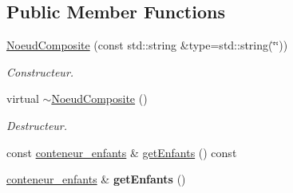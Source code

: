 \subsection*{Public Member Functions}
\begin{DoxyCompactItemize}
\item 
\hyperlink{group__inf2990_ga21f20f8612314721e4e63ea0596d0b42}{Noeud\-Composite} (const std\-::string \&type=std\-::string(\char`\"{}\char`\"{}))
\begin{DoxyCompactList}\small\item\em Constructeur. \end{DoxyCompactList}\item 
virtual \hyperlink{group__inf2990_gaada4bd846bd950f2ac186b09f35aa9c6}{$\sim$\-Noeud\-Composite} ()
\begin{DoxyCompactList}\small\item\em Destructeur. \end{DoxyCompactList}\item 
const \hyperlink{class_noeud_composite_a697e52516e154d6943a1e1aa9533c317}{conteneur\-\_\-enfants} \& \hyperlink{class_noeud_composite_a2aa41adb03339f75732a86016be65112}{get\-Enfants} () const 
\item 
\hypertarget{class_noeud_composite_a2c498f2235878e7bb686b4da27fb86da}{\hyperlink{class_noeud_composite_a697e52516e154d6943a1e1aa9533c317}{conteneur\-\_\-enfants} \& {\bfseries get\-Enfants} ()}\label{class_noeud_composite_a2c498f2235878e7bb686b4da27fb86da}


\end{DoxyCompactItemize}
